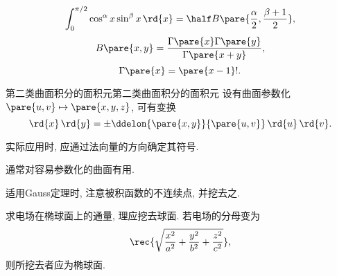 \documentclass{ctexart}
\begin{document}
\begin{finale}
	\[ \int_0^{\pi/2} \cos^\alpha x \sin^\beta x\,\rd{x} = \half B\pare{\frac{\alpha}{2},\frac{\beta+1}{2}}, \]
	\[ B\pare{x,y} = \frac{\Gamma\pare{x}\Gamma\pare{y}}{\Gamma\pare{x+y}}, \]
	\[ \Gamma\pare{x} = \pare{x-1}!. \]
\end{finale}
\begin{reflex}{第二类曲面积分的面积元}{第二类曲面积分的面积元}
	设有曲面参数化$\pare{u,v}\mapsto \pare{x,y,z}$, 可有变换
	\[ \rd{x}\,\rd{y} = \pm\ddelon{\pare{x,y}}{\pare{u,v}}\,\rd{u}\,\rd{v}. \]
	\begin{pitfall}
		实际应用时, 应通过法向量的方向确定其符号.
	\end{pitfall}
	通常对容易参数化的曲面有用.
\end{reflex}
\begin{pitfall}
	适用Gauss定理时, 注意被积函数的不连续点, 并挖去之.
\end{pitfall}
\begin{ex}
	求电场在椭球面上的通量, 理应挖去球面. 若电场的分母变为
	\[ \rec{\sqrt{\frac{x^2}{a^2}+\frac{y^2}{b^2}+\frac{z^2}{c^2}}}, \]
	则所挖去者应为椭球面.
\end{ex}
\end{document}
